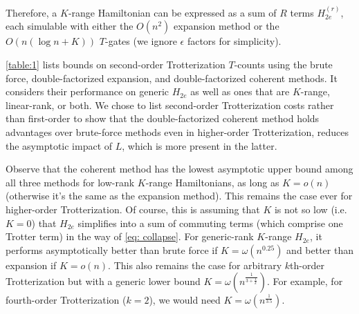 Therefore, a $K$-range Hamiltonian can be expressed as a sum of $R$ terms $H_{2e}^{(r)}$, each simulable with either the $O(n^2)$ expansion method or the $O(n(\log{n} + K))$ $T$-gates (we ignore $\epsilon$ factors for simplicity).

\ref{table:1} lists bounds on second-order Trotterization $T$-counts using the brute force, double-factorized expansion, and double-factorized coherent methods. It considers their performance on generic $H_{2e}$ as well as ones that are $K$-range, linear-rank, or both. We chose to list second-order Trotterization costs rather than first-order to show that the double-factorized coherent method holds advantages over brute-force methods even in higher-order Trotterization, reduces the asymptotic impact of $L$, which is more present in the latter.

Observe that the coherent method has the lowest asymptotic upper bound among all three methods for low-rank $K$-range Hamiltonians, as long as $K = o(n)$ (otherwise it's the same as the expansion method). This remains the case ever for higher-order Trotterization. Of course, this is assuming that $K$ is not so low (i.e. $K = 0$) that $H_{2e}$ simplifies into a sum of commuting terms (which comprise one Trotter term) in the way of \eqref{eq: collapse}.
For generic-rank $K$-range $H_{2e}$, it performs asymptotically better than brute force if $K = \omega(n^{0.25})$ and better than expansion if $K = o(n)$. This also remains the case for arbitrary $k$th-order Trotterization but with a generic lower bound $K = \omega(n^{\frac{1}{3 + \frac{1}{k}}})$. For example, for fourth-order Trotterization ($k = 2$), we would need $K = \omega(n^{\frac{1}{3.5}})$.

